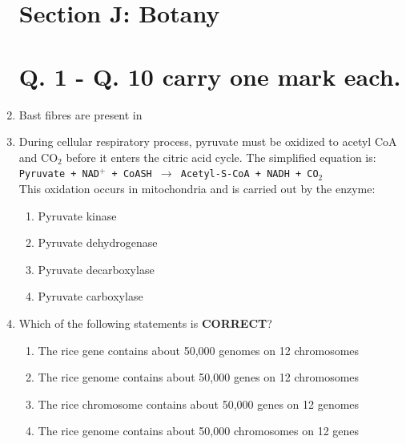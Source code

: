 \documentclass[journal]{IEEEtran}
\begin{document}
\begin{enumerate}
\clearpage
\section*{Section J: Botany}
\setcounter{enumi}{0}
\section*{Q. 1 - Q. 10 carry one mark each.}

\item Bast fibres are present in\hfill  \textit{}
\begin{enumerate}
\end{enumerate}

\item During cellular respiratory process, pyruvate must be oxidized to acetyl CoA and CO$_2$ before it enters the citric acid cycle. The simplified equation is: \\
\texttt{Pyruvate + NAD$^+$ + CoASH $\rightarrow$ Acetyl-S-CoA + NADH + CO$_2$} \\
This oxidation occurs in mitochondria and is carried out by the enzyme:\hfill  \textit{}
\begin{enumerate}
    \item Pyruvate kinase
    \item Pyruvate dehydrogenase
    \item Pyruvate decarboxylase
    \item Pyruvate carboxylase
\end{enumerate}

\item Which of the following statements is \textbf{CORRECT}?\hfill  \textit{}
\begin{enumerate}
    \item The rice gene contains about 50,000 genomes on 12 chromosomes
    \item The rice genome contains about 50,000 genes on 12 chromosomes
    \item The rice chromosome contains about 50,000 genes on 12 genomes
    \item The rice genome contains about 50,000 chromosomes on 12 genes
\end{enumerate}


\end{enumerate}
\end{document}

